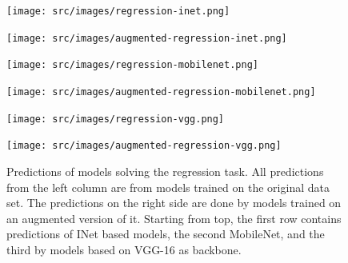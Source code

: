 
\begin{figure}
    \centering
    \vspace{-25pt}
    \begin{multicols}{2}
        \begin{minipage}{.45\textwidth}
            \texttt{[image: src/images/regression-inet.png]}
        \end{minipage}
        \columnbreak
        \begin{minipage}{.45\textwidth}
            \texttt{[image: src/images/augmented-regression-inet.png]}
        \end{minipage}
    \end{multicols}
    \begin{multicols}{2}
        \begin{minipage}{.45\textwidth}
            \texttt{[image: src/images/regression-mobilenet.png]}
        \end{minipage}
        \columnbreak
        \begin{minipage}{.45\textwidth}
            \texttt{[image: src/images/augmented-regression-mobilenet.png]}
        \end{minipage}
    \end{multicols}
    \begin{multicols}{2}
        \begin{minipage}{.45\textwidth}
            \texttt{[image: src/images/regression-vgg.png]}
        \end{minipage}
        \columnbreak
        \begin{minipage}{.45\textwidth}
            \texttt{[image: src/images/augmented-regression-vgg.png]}
        \end{minipage}
    \end{multicols}
    \caption{Predictions of models solving the regression task. All predictions from the left column are from models trained on the original data set. The predictions on the right side are done by models trained on an augmented version of it.
    Starting from top, the first row contains predictions of INet based models, the second MobileNet, and the third by models based on VGG-16 as backbone.}
    \label{fig:regression-samples}
\end{figure}

